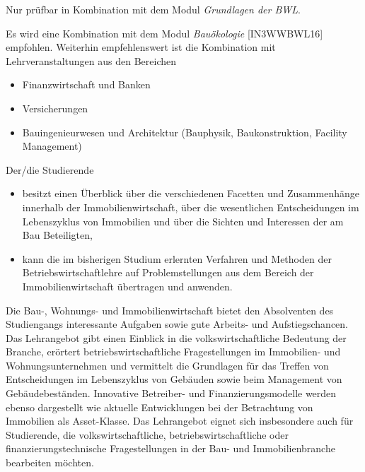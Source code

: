 \begin{module}
\begin{styleenv}
\begin{assessment}
\end{assessment}

\begin{conditions}Nur prüfbar in Kombination mit dem Modul \emph{Grundlagen der BWL}.

 \end{conditions}

\begin{recommendations}Es wird eine Kombination mit dem Modul \emph{Bauökologie} [IN3WWBWL16] empfohlen. Weiterhin empfehlenswert ist die Kombination mit Lehrveranstaltungen aus den Bereichen

 \begin{itemize}\item Finanzwirtschaft und Banken  \item Versicherungen  \item Bauingenieurwesen und Architektur (Bauphysik, Baukonstruktion, Facility Management)  \end{itemize}\end{recommendations}
\end{styleenv}

\begin{learningoutcomes}
Der/die Studierende

 \begin{itemize}\item besitzt einen Überblick über die verschiedenen Facetten und Zusammenhänge innerhalb der Immobilienwirtschaft, über die wesentlichen Entscheidungen im Lebenszyklus von Immobilien und über die Sichten und Interessen der am Bau Beteiligten,  \item kann die im bisherigen Studium erlernten Verfahren und Methoden der Betriebswirtschaftlehre auf Problemstellungen aus dem Bereich der Immobilienwirtschaft übertragen und anwenden.  \end{itemize}
\end{learningoutcomes}

\begin{content}
Die Bau-, Wohnungs- und Immobilienwirtschaft bietet den Absolventen des Studiengangs interessante Aufgaben sowie gute Arbeits- und Aufstiegschancen. Das Lehrangebot gibt einen Einblick in die volkswirtschaftliche Bedeutung der Branche, erörtert betriebswirtschaftliche Fragestellungen im Immobilien- und Wohnungsunternehmen und vermittelt die Grundlagen für das Treffen von Entscheidungen im Lebenszyklus von Gebäuden sowie beim Management von Gebäudebeständen. Innovative Betreiber- und Finanzierungsmodelle werden ebenso dargestellt wie aktuelle Entwicklungen bei der Betrachtung von Immobilien als Asset-Klasse. Das Lehrangebot eignet sich insbesondere auch für Studierende, die volkswirtschaftliche, betriebswirtschaftliche oder finanzierungstechnische Fragestellungen in der Bau- und Immobilienbranche bearbeiten möchten.


\end{content}



\end{module}

